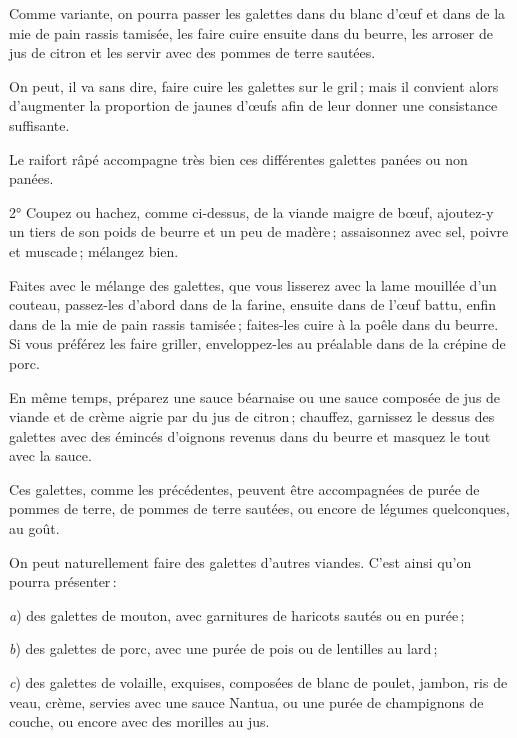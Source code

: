 \sk

Comme variante, on pourra passer les galettes dans du blanc d'œuf et dans de la
mie de pain rassis tamisée, les faire cuire ensuite dans du beurre, les arroser
de jus de citron et les servir avec des pommes de terre sautées.

\sk

On peut, il va sans dire, faire cuire les galettes sur le gril ; mais il
convient alors d'augmenter la proportion de jaunes d'œufs afin de leur donner
une consistance suffisante.

Le raifort râpé accompagne très bien ces différentes galettes panées ou non
panées.

\sk

2° Coupez ou hachez, comme ci-dessus, de la viande maigre de bœuf, ajoutez-y un
tiers de son poids de beurre et un peu de madère ; assaisonnez avec sel, poivre
et muscade ; mélangez bien.

Faites avec le mélange des galettes, que vous lisserez avec la lame mouillée
d'un couteau, passez-les d'abord dans de la farine, ensuite dans de l'œuf
battu, enfin dans de la mie de pain rassis tamisée ; faites-les cuire à la
poêle dans du beurre. Si vous préférez les faire griller, enveloppez-les au
préalable dans de la crépine de porc.

En même temps, préparez une sauce béarnaise ou une sauce composée de jus de
viande et de crème aigrie par du jus de citron ; chauffez, garnissez le dessus
des galettes avec des émincés d'oignons revenus dans du beurre et masquez le
tout avec la sauce.

Ces galettes, comme les précédentes, peuvent être accompagnées de purée de
pommes de terre, de pommes de terre sautées, ou encore de légumes quelconques,
au goût.

\sk

On peut naturellement faire des galettes d'autres viandes. C'est ainsi qu'on
pourra présenter :

\medskip


\textit{a}) des galettes de mouton, avec garnitures de haricots sautés ou en purée ;

\textit{b}) des galettes de porc, avec une purée de pois ou de lentilles au lard ;

\textit{c}) des galettes de volaille, exquises, composées de blanc de poulet, jambon,
ris de veau, crème, servies avec une sauce Nantua, ou une purée de champignons
de couche, ou encore avec des morilles au jus.

